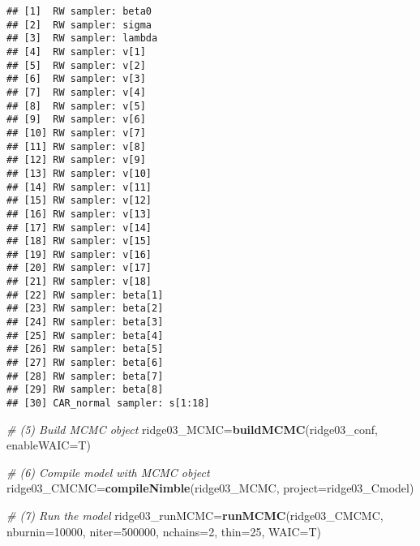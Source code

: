 \documentclass[]{article}
\newenvironment{Shaded}{\begin{snugshade}}{\end{snugshade}}
\newcommand{\CommentTok}[1]{\textcolor[rgb]{0.56,0.35,0.01}{\textit{#1}}}
\newcommand{\DataTypeTok}[1]{\textcolor[rgb]{0.13,0.29,0.53}{#1}}
\newcommand{\DecValTok}[1]{\textcolor[rgb]{0.00,0.00,0.81}{#1}}
\newcommand{\KeywordTok}[1]{\textcolor[rgb]{0.13,0.29,0.53}{\textbf{#1}}}
\newcommand{\NormalTok}[1]{#1}
\newcommand{\OperatorTok}[1]{\textcolor[rgb]{0.81,0.36,0.00}{\textbf{#1}}}
\newcommand{\StringTok}[1]{\textcolor[rgb]{0.31,0.60,0.02}{#1}}
\begin{document}
\begin{Shaded}
\end{Shaded}

\begin{verbatim}
## [1]  RW sampler: beta0
## [2]  RW sampler: sigma
## [3]  RW sampler: lambda
## [4]  RW sampler: v[1]
## [5]  RW sampler: v[2]
## [6]  RW sampler: v[3]
## [7]  RW sampler: v[4]
## [8]  RW sampler: v[5]
## [9]  RW sampler: v[6]
## [10] RW sampler: v[7]
## [11] RW sampler: v[8]
## [12] RW sampler: v[9]
## [13] RW sampler: v[10]
## [14] RW sampler: v[11]
## [15] RW sampler: v[12]
## [16] RW sampler: v[13]
## [17] RW sampler: v[14]
## [18] RW sampler: v[15]
## [19] RW sampler: v[16]
## [20] RW sampler: v[17]
## [21] RW sampler: v[18]
## [22] RW sampler: beta[1]
## [23] RW sampler: beta[2]
## [24] RW sampler: beta[3]
## [25] RW sampler: beta[4]
## [26] RW sampler: beta[5]
## [27] RW sampler: beta[6]
## [28] RW sampler: beta[7]
## [29] RW sampler: beta[8]
## [30] CAR_normal sampler: s[1:18]
\end{verbatim}

\begin{Shaded}
\begin{Highlighting}[]
\CommentTok{# (5) Build MCMC object}
\NormalTok{ridge03_MCMC=}\KeywordTok{buildMCMC}\NormalTok{(ridge03_conf, }\DataTypeTok{enableWAIC=}\NormalTok{T)}

\CommentTok{# (6) Compile model with MCMC object}
\NormalTok{ridge03_CMCMC=}\KeywordTok{compileNimble}\NormalTok{(ridge03_MCMC, }\DataTypeTok{project=}\NormalTok{ridge03_Cmodel)}

\CommentTok{# (7) Run the model}
\NormalTok{ridge03_runMCMC=}\KeywordTok{runMCMC}\NormalTok{(ridge03_CMCMC, }\DataTypeTok{nburnin=}\DecValTok{10000}\NormalTok{, }\DataTypeTok{niter=}\DecValTok{500000}\NormalTok{, }\DataTypeTok{nchains=}\DecValTok{2}\NormalTok{, }\DataTypeTok{thin=}\DecValTok{25}\NormalTok{, }\DataTypeTok{WAIC=}\NormalTok{T)}
\end{Highlighting}
\end{Shaded}
\end{document}
